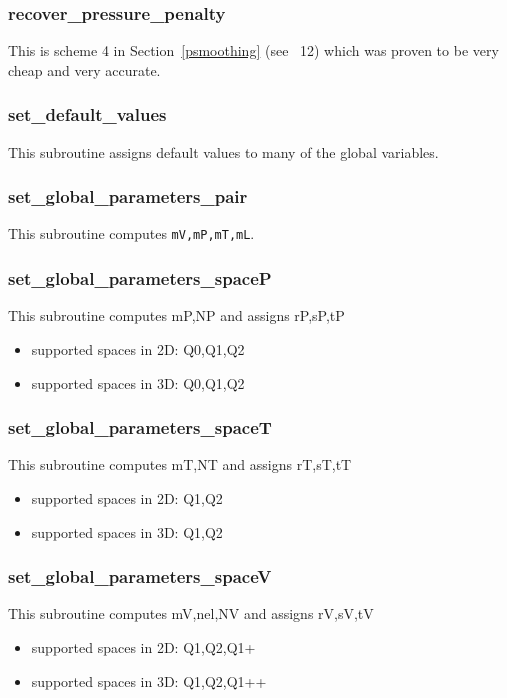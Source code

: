  \subsubsection{recover\_pressure\_penalty}
 This is scheme 4 in Section~\ref{psmoothing} (see \stone~12) which was proven to be 
 very cheap and very accurate. 
 \subsubsection{set\_default\_values}
 This subroutine assigns default values to many of the global variables.
 \subsubsection{set\_global\_parameters\_pair}
 This subroutine computes {\tt mV,mP,mT,mL}.
 \subsubsection{set\_global\_parameters\_spaceP}
 This subroutine computes mP,NP and assigns rP,sP,tP
 \begin{itemize}
 \item supported spaces in 2D: Q0,Q1,Q2
 \item supported spaces in 3D: Q0,Q1,Q2
 \end{itemize}
 \subsubsection{set\_global\_parameters\_spaceT}
 This subroutine computes mT,NT and assigns rT,sT,tT
 \begin{itemize}
 \item supported spaces in 2D: Q1,Q2
 \item supported spaces in 3D: Q1,Q2
 \end{itemize}
 \subsubsection{set\_global\_parameters\_spaceV}
 This subroutine computes mV,nel,NV and assigns rV,sV,tV
 \begin{itemize}
 \item supported spaces in 2D: Q1,Q2,Q1+
 \item supported spaces in 3D: Q1,Q2,Q1++
 \end{itemize}
